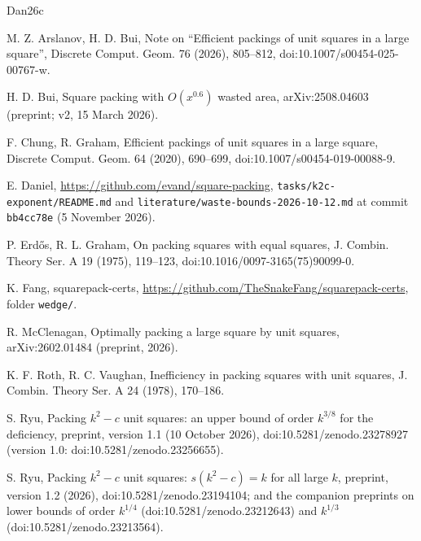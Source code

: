 \documentclass[11pt,letterpaper]{amsart}
\theoremstyle{plain}
\theoremstyle{definition}
\theoremstyle{remark}
\begin{document}
\begin{thebibliography}{Dan26c}

 M. Z. Arslanov, H. D. Bui, Note on ``Efficient packings of unit squares in a large square'', Discrete Comput. Geom. 76 (2026), 805--812, doi:10.1007/s00454-025-00767-w.

 H. D. Bui, Square packing with $O(x^{0.6})$ wasted area, arXiv:2508.04603 (preprint; v2, 15 March 2026).

 F. Chung, R. Graham, Efficient packings of unit squares in a large square, Discrete Comput. Geom. 64 (2020), 690--699, doi:10.1007/s00454-019-00088-9.

 E. Daniel, \url{https://github.com/evand/square-packing}, \texttt{tasks/k2c-exponent/README.md} and \texttt{literature/waste-bounds-2026-10-12.md} at commit \texttt{bb4cc78e} (5 November 2026).

 P. Erd\H{o}s, R. L. Graham, On packing squares with equal squares, J. Combin. Theory Ser. A 19 (1975), 119--123, doi:10.1016/0097-3165(75)90099-0.

 K. Fang, squarepack-certs, \url{https://github.com/TheSnakeFang/squarepack-certs}, folder \texttt{wedge/}.

 R. McClenagan, Optimally packing a large square by unit squares, arXiv:2602.01484 (preprint, 2026).

 K. F. Roth, R. C. Vaughan, Inefficiency in packing squares with unit squares, J. Combin. Theory Ser. A 24 (1978), 170--186.

 S. Ryu, Packing $k^2-c$ unit squares: an upper bound of order $k^{3/8}$ for the deficiency, preprint, version 1.1 (10 October 2026), doi:10.5281/zenodo.23278927 (version 1.0: doi:10.5281/zenodo.23256655).

 S. Ryu, Packing $k^2-c$ unit squares: $s(k^2-c)=k$ for all large $k$, preprint, version 1.2 (2026), doi:10.5281/zenodo.23194104; and the companion preprints on lower bounds of order $k^{1/4}$ (doi:10.5281/zenodo.23212643) and $k^{1/3}$ (doi:10.5281/zenodo.23213564).

\end{thebibliography}
\end{document}
